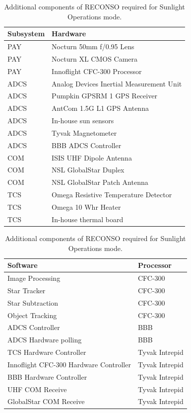 \documentclass{article}
\begin{document}
\begin{table}[h!]
\caption{Additional components of RECONSO required for Sunlight Operations mode.}
\begin{adjustbox}{center}
\begin{tabular}{|l|l|}
\hline
Subsystem & Hardware \\ \hline \hline
PAY & Nocturn 50mm f/0.95 Lens  \\ \hline
PAY & Nocturn XL CMOS Camera  \\ \hline
PAY & Innoflight CFC-300 Processor  \\ \hline \hline
ADCS & Analog Devices Inertial Measurement Unit  \\ \hline
ADCS & Pumpkin GPSRM 1 GPS Receiver \\ \hline
ADCS & AntCom 1.5G L1 GPS Antenna  \\ \hline
ADCS & In-house sun sensors  \\ \hline
ADCS & Tyvak Magnetometer \\ \hline
ADCS & BBB ADCS Controller \\ \hline \hline
COM & ISIS UHF Dipole Antenna  \\ \hline
COM & NSL GlobalStar Duplex  \\ \hline
COM & NSL GlobalStar Patch Antenna \\ \hline \hline
TCS & Omega Resistive Temperature Detector \\ \hline
TCS & Omega 10 Whr Heater  \\ \hline
TCS & In-house thermal board \\ \hline
\end{tabular}

\quad

\begin{tabular}{|l|l|}
\hline
Software & Processor \\ \hline \hline
Image Processing & CFC-300 \\ \hline
Star Tracker & CFC-300 \\ \hline
Star Subtraction & CFC-300 \\ \hline
Object Tracking & CFC-300 \\ \hline \hline
ADCS Controller & BBB \\ \hline
ADCS Hardware polling & BBB \\ \hline \hline
TCS Hardware Controller & Tyvak Intrepid \\ \hline
Innoflight CFC-300 Hardware Controller & Tyvak Intrepid \\ \hline
BBB Hardware Controller & Tyvak Intrepid \\ \hline
UHF COM Receive & Tyvak Intrepid \\ \hline
GlobalStar COM Receive & Tyvak Intrepid \\ \hline
\end{tabular}
\end{adjustbox}
\end{table}
\end{document}
